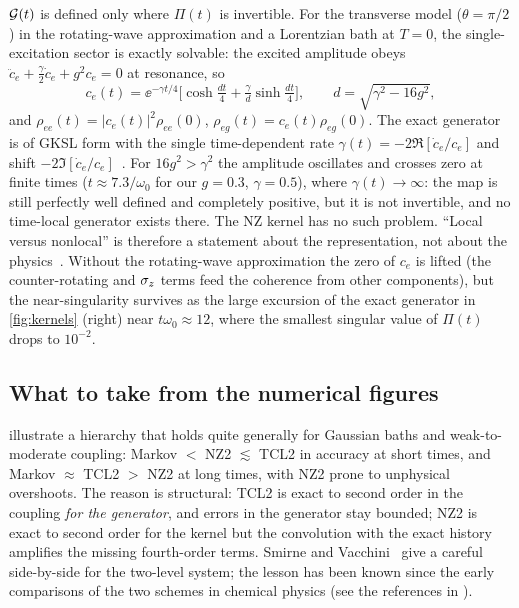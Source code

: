$\mathcal{G}(t)$ is defined only where $\Pi(t)$ is invertible.
For the transverse model ($\theta=\pi/2$) in the rotating-wave approximation and a Lorentzian bath at $T=0$, the single-excitation sector is exactly solvable: the excited amplitude obeys $\ddot c_e+\tfrac\gamma2\dot c_e+g^2c_e=0$ at resonance, so
\begin{equation}
  c_e(t)=\ee^{-\gamma t/4}\Big[\cosh\tfrac{dt}{4}+\tfrac{\gamma}{d}\sinh\tfrac{dt}{4}\Big],\qquad d=\sqrt{\gamma^2-16g^2},
\end{equation}
and $\rho_{ee}(t)=|c_e(t)|^2\rho_{ee}(0)$, $\rho_{eg}(t)=c_e(t)\rho_{eg}(0)$.
The exact generator is of GKSL form with the single time-dependent rate $\gamma(t)=-2\Re[\dot c_e/c_e]$ and shift $-2\Im[\dot c_e/c_e]$~\cite[Sec.~10.1]{BreuerPetruccione,Vacchini2010}.
For $16g^2>\gamma^2$ the amplitude oscillates and crosses zero at finite times ($t\approx7.3/\omega_0$ for our $g=0.3$, $\gamma=0.5$), where $\gamma(t)\to\infty$: the map is still perfectly well defined and completely positive, but it is not invertible, and no time-local generator exists there.
The NZ kernel has no such problem.
``Local versus nonlocal'' is therefore a statement about the representation, not about the physics~\cite{ChruscinskiKossakowski2010}.
Without the rotating-wave approximation the zero of $c_e$ is lifted (the counter-rotating and $\sigma_z$ terms feed the coherence from other components), but the near-singularity survives as the large excursion of the exact generator in \cref{fig:kernels} (right) near $t\omega_0\approx12$, where the smallest singular value of $\Pi(t)$ drops to $10^{-2}$.

\subsection{What to take from the numerical figures}

 illustrate a hierarchy that holds quite generally for Gaussian baths and weak-to-moderate coupling: Markov $<$ NZ2 $\lesssim$ TCL2 in accuracy at short times, and Markov $\approx$ TCL2 $>$ NZ2 at long times, with NZ2 prone to unphysical overshoots.
The reason is structural: TCL2 is exact to second order in the coupling \emph{for the generator}, and errors in the generator stay bounded; NZ2 is exact to second order for the kernel but the convolution with the exact history amplifies the missing fourth-order terms.
Smirne and Vacchini~\cite{SmirneVacchini2010} give a careful side-by-side for the two-level system; the lesson has been known since the early comparisons of the two schemes in chemical physics (see the references in \cite{BreuerKapplerPetruccione2001}).

